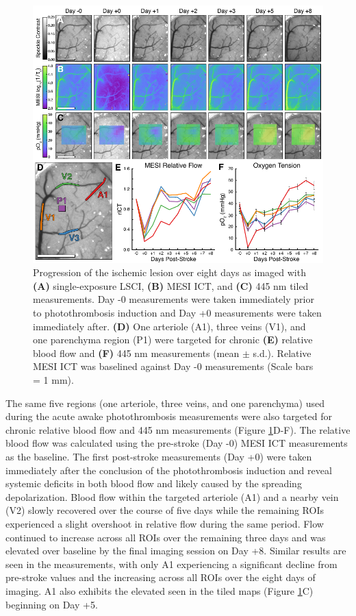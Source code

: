 \begin{figure}
    \includegraphics{figures/chapter_5/chronicawakephotothrombosis.pdf}
    \caption{
        \label{fig:chronicawakephotothrombosis}
        Progression of the ischemic lesion over eight days as imaged with \textbf{(A)} single-exposure LSCI, \textbf{(B)} MESI ICT, and \textbf{(C)} 445 nm tiled  measurements. Day -0 measurements were taken immediately prior to photothrombosis induction and Day +0 measurements were taken immediately after. \textbf{(D)} One arteriole (A1), three veins (V1), and one parenchyma region (P1) were targeted for chronic \textbf{(E)} relative blood flow and \textbf{(F)} 445 nm  measurements (mean $\pm$ s.d.). Relative MESI ICT was baselined against Day -0 measurements (Scale bars = 1 mm).
    }
\end{figure}

The same five regions (one arteriole, three veins, and one parenchyma) used during the acute awake photothrombosis measurements were also targeted for chronic relative blood flow and 445 nm  measurements (Figure \ref{fig:chronicawakephotothrombosis}D-F). The relative blood flow was calculated using the pre-stroke (Day -0) MESI ICT measurements as the baseline. The first post-stroke measurements (Day +0) were taken immediately after the conclusion of the photothrombosis induction and reveal systemic deficits in both blood flow and  likely caused by the spreading depolarization. Blood flow within the targeted arteriole (A1) and a nearby vein (V2) slowly recovered over the course of five days while the remaining ROIs experienced a slight overshoot in relative flow during the same period. Flow continued to increase across all ROIs over the remaining three days and was elevated over baseline by the final imaging session on Day +8. Similar results are seen in the  measurements, with only A1 experiencing a significant decline from pre-stroke values and the  increasing across all ROIs over the eight days of imaging. A1 also exhibits the elevated  seen in the tiled maps (Figure \ref{fig:chronicawakephotothrombosis}C) beginning on Day +5.

